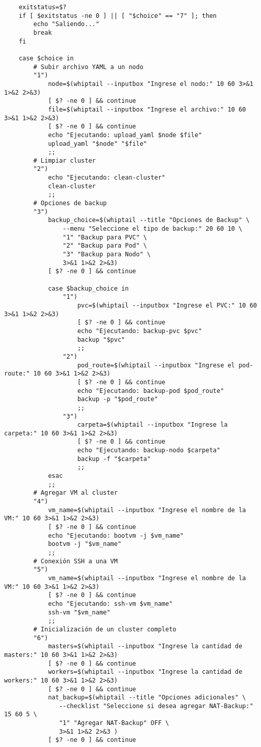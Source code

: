 \begin{verbatim}
    exitstatus=$?
    if [ $exitstatus -ne 0 ] || [ "$choice" == "7" ]; then
        echo "Saliendo..."
        break
    fi

    case $choice in
        # Subir archivo YAML a un nodo
        "1")
            node=$(whiptail --inputbox "Ingrese el nodo:" 10 60 3>&1 1>&2 2>&3)
            [ $? -ne 0 ] && continue
            file=$(whiptail --inputbox "Ingrese el archivo:" 10 60 3>&1 1>&2 2>&3)
            [ $? -ne 0 ] && continue
            echo "Ejecutando: upload_yaml $node $file"
            upload_yaml "$node" "$file"
            ;;
        # Limpiar cluster
        "2")
            echo "Ejecutando: clean-cluster"
            clean-cluster
            ;;
        # Opciones de backup
        "3")
            backup_choice=$(whiptail --title "Opciones de Backup" \
                --menu "Seleccione el tipo de backup:" 20 60 10 \
                "1" "Backup para PVC" \
                "2" "Backup para Pod" \
                "3" "Backup para Nodo" \
                3>&1 1>&2 2>&3)
            [ $? -ne 0 ] && continue

            case $backup_choice in
                "1")
                    pvc=$(whiptail --inputbox "Ingrese el PVC:" 10 60 3>&1 1>&2 2>&3)
                    [ $? -ne 0 ] && continue
                    echo "Ejecutando: backup-pvc $pvc"
                    backup "$pvc"
                    ;;
                "2")
                    pod_route=$(whiptail --inputbox "Ingrese el pod-route:" 10 60 3>&1 1>&2 2>&3)
                    [ $? -ne 0 ] && continue
                    echo "Ejecutando: backup-pod $pod_route"
                    backup -p "$pod_route"
                    ;;
                "3")
                    carpeta=$(whiptail --inputbox "Ingrese la carpeta:" 10 60 3>&1 1>&2 2>&3)
                    [ $? -ne 0 ] && continue
                    echo "Ejecutando: backup-nodo $carpeta"
                    backup -f "$carpeta"
                    ;;
            esac
            ;;
        # Agregar VM al cluster
        "4")
            vm_name=$(whiptail --inputbox "Ingrese el nombre de la VM:" 10 60 3>&1 1>&2 2>&3)
            [ $? -ne 0 ] && continue
            echo "Ejecutando: bootvm -j $vm_name"
            bootvm -j "$vm_name"
            ;;
        # Conexión SSH a una VM
        "5")
            vm_name=$(whiptail --inputbox "Ingrese el nombre de la VM:" 10 60 3>&1 1>&2 2>&3)
            [ $? -ne 0 ] && continue
            echo "Ejecutando: ssh-vm $vm_name"
            ssh-vm "$vm_name"
            ;;
        # Inicialización de un cluster completo
        "6")
            masters=$(whiptail --inputbox "Ingrese la cantidad de masters:" 10 60 3>&1 1>&2 2>&3)
            [ $? -ne 0 ] && continue
            workers=$(whiptail --inputbox "Ingrese la cantidad de workers:" 10 60 3>&1 1>&2 2>&3)
            [ $? -ne 0 ] && continue
            nat_backup=$(whiptail --title "Opciones adicionales" \
               --checklist "Seleccione si desea agregar NAT-Backup:" 15 60 5 \
               "1" "Agregar NAT-Backup" OFF \
               3>&1 1>&2 2>&3 )
            [ $? -ne 0 ] && continue


\end{verbatim}
